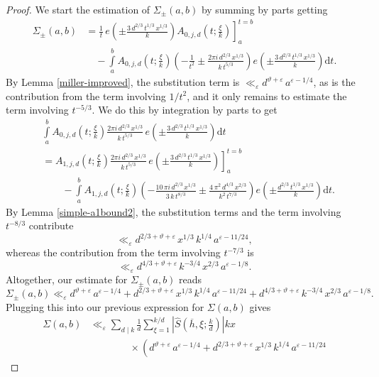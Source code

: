 \documentclass[a4paper,10pt,twoside]{amsart}
\theoremstyle{definition}
\numberwithin{equation}{section}
\newcommand\eps{\varepsilon}
\renewcommand\:{\colon}
\begin{document}
\begin{proof}
We start the estimation of $\Sigma_\pm(a,b)$ by summing by parts getting
\begin{align*}
\Sigma_\pm(a,b)
&=\left.\frac1t\,e\!\left(\pm\frac{3\,d^{2/3}\,t^{1/3}\,x^{1/3}}k\right)A_{0,j,d}\!\left(t;\frac\xi k\right)\right]_a^{t=b}\\
&\quad-\int\limits_a^bA_{0,j,d}\!\left(t;\frac\xi k\right)\left(-\frac1{t^2}\pm\frac{2\pi i\,d^{2/3}\,x^{1/3}}{k\,t^{5/3}}\right)e\!\left(\pm\frac{3\,d^{2/3}\,t^{1/3}\,x^{1/3}}k\right)\mathrm dt.
\end{align*}
By Lemma \ref{miller-improved}, the substitution term is $\ll_\eps d^{\vartheta+\varepsilon}\,a^{\varepsilon-1/4}$, as is the contribution from the term involving $1/t^2$, and it only remains to estimate the term involving $t^{-5/3}$. We do this by integration by parts to get
\begin{align*}
&\int\limits_a^bA_{0,j,d}\!\left(t;\frac\xi k\right)\frac{2\pi i\,d^{2/3}\,x^{1/3}}{k\,t^{5/3}}\,e\!\left(\pm\frac{3\,d^{2/3}\,t^{1/3}\,x^{1/3}}k\right)\mathrm dt\\
&=\left.A_{1,j,d}\!\left(t;\frac\xi k\right)\frac{2\pi i\,d^{2/3}\,x^{1/3}}{k\,t^{5/3}}\,e\!\left(\pm\frac{3\,d^{2/3}\,t^{1/3}\,x^{1/3}}k\right)\right]_a^{t=b}\\
&\qquad-\int\limits_a^bA_{1,j,d}\!\left(t;\frac\xi k\right)\left(-\frac{10\,\pi i\,d^{2/3}\,x^{1/3}}{3\,k\,t^{8/3}}\pm\frac{4\,\pi^2\,d^{4/3}\,x^{2/3}}{k^2\,t^{7/3}}\right)e\!\left(\pm\frac{d^{2/3}\,t^{1/3}\,x^{1/3}}k\right)\mathrm dt.
\end{align*}
By Lemma \ref{simple-a1bound2}, the substitution terms and the term involving $t^{-8/3}$ contribute
\[\ll_\eps d^{2/3+\vartheta+\varepsilon}\,x^{1/3}\,k^{1/4}\,a^{\varepsilon-11/24},\]
whereas the contribution from the term involving $t^{-7/3}$ is
\[\ll_\eps d^{4/3+\vartheta+\varepsilon}\,k^{-3/4}\,x^{2/3}\,a^{\varepsilon-1/8}.\]
Altogether, our estimate for $\Sigma_\pm(a,b)$ reads
\[\Sigma_\pm(a,b)\ll_\varepsilon d^{\vartheta+\varepsilon}\,a^{\varepsilon-1/4}+d^{2/3+\vartheta+\varepsilon}\,x^{1/3}\,k^{1/4}\,a^{\varepsilon-11/24}
+d^{4/3+\vartheta+\varepsilon}\,k^{-3/4}\,x^{2/3}\,a^{\varepsilon-1/8}.\]
Plugging this into our previous expression for $\Sigma(a,b)$ gives
\begin{align*}
\Sigma(a,b)&\ll_\varepsilon\sum_{d\mid k}\frac1d\sum_{\xi=1}^{k/d}\left|\widehat S\!\left(\overline h,\xi;\frac kd\right)\right|kx\\
&\qquad\qquad\times\left(d^{\vartheta+\varepsilon}\,a^{\varepsilon-1/4}+d^{2/3+\vartheta+\varepsilon}\,x^{1/3}\,k^{1/4}\,a^{\varepsilon-11/24}

\end{align*}
\end{proof}
\end{document}
